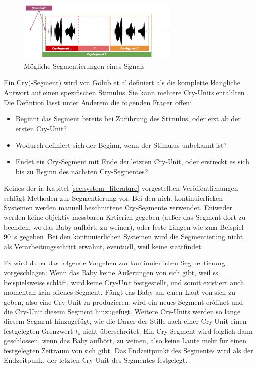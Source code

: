 \begin{figure}[H]
	\centering
	\includegraphics[width=0.7\textwidth]{bilder/segmentierung07.png}
	\caption{Mögliche Segmentierungen eines Signals}
	\label{img:segmenting02}
\end{figure}

Ein Cry(-Segment) wird von Golub et al definiert als \glqq die komplette klangliche Antwort auf einen spezifischen Stimulus. Sie kann mehrere Cry-Units entahlten \grqq. \cite[S. 61, übersetzt aus dem Englischen]{cryModel}. Die Defintion lässt unter Anderem die folgenden Fragen offen:

\begin{itemize}[leftmargin=*]
	\item Beginnt das Segment bereits bei Zuführung des Stimulus, oder erst ab der ersten Cry-Unit? 
	\item Wodurch definiert sich der Beginn, wenn der Stimulus unbekannt ist?
	\item Endet ein Cry-Segment mit Ende der letzten \glqq Cry-Unit\grqq{}, oder erstreckt es sich bis zu Beginn des nächsten Cry-Segmentes?
\end{itemize}

Keines der in Kapitel \ref{sec:system_literature} vorgestellten Veröffentlichungen schlägt Methoden zur Segmentierung vor. Bei den nicht-kontinuierlichen Systemen werden manuell beschnittene Cry-Segmente verwendet. Entweder werden keine objektiv messbaren Krtierien gegeben (außer \grqq das Segment dort zu beenden, wo das Baby aufhört, zu weinen\grqq{}), oder feste Längen wie zum Beispiel \SI{90}{\second}\cite[S. 324]{rythmic} gegeben. Bei den kontinuierlichen Systemen wird die Segmentierung nicht als Verarbeitungsschritt erwähnt, eventuell, weil keine stattfindet.

Es wird daher das folgende Vorgehen zur kontinuierlichen Segmentierung vorgeschlagen: Wenn das Baby keine Äußerungen von sich gibt, weil es beispielsweise schläft, wird keine Cry-Unit festgestellt, und somit existiert auch momentan kein offenes Segment. Fängt das Baby an, einen Laut von sich zu geben, also eine Cry-Unit zu produzieren, wird ein neues Segment eröffnet und die Cry-Unit diesem Segment hinzugefügt. Weitere Cry-Units werden so lange diesem Segment hinzugefügt, wie die Dauer der Stille nach einer Cry-Unit einen festgelegten Grenzwert $t_{s}$ nicht überschreitet. Ein Cry-Segment wird folglich dann geschlossen, wenn das Baby \glqq aufhört, zu weinen\grqq{}, also keine Laute mehr für einen festgelegten Zeitraum von sich gibt. Das Endzeitpunkt des Segmentes wird als der Endzeitpunkt der letzten Cry-Unit des Segmentes festgelegt.

